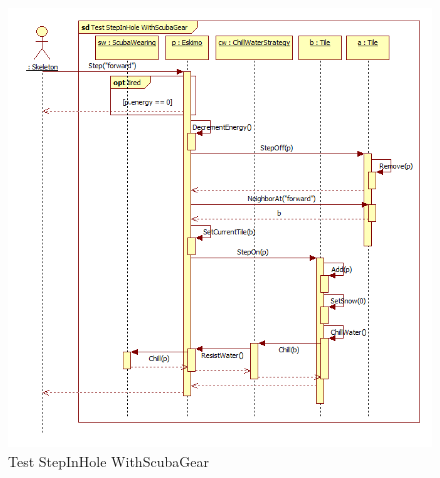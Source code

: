 \begin{figure}[H]
	\begin{center}
		\includegraphics[width=17cm]{chapters/chapter05/diagrams/Test_StepInHole_WithScubaGear.png}
		\caption{Test StepInHole WithScubaGear}
		\label{fig:Test StepInHole WithScubaGear}
	\end{center}
\end{figure}


